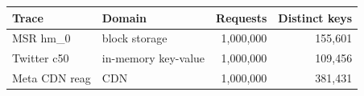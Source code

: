 \begin{tabular}{llrr}
\toprule
Trace & Domain & Requests & Distinct keys \\
\midrule
MSR hm\_0 & block storage & 1,000,000 & 155,601 \\
Twitter c50 & in-memory key-value & 1,000,000 & 109,456 \\
Meta CDN reag & CDN & 1,000,000 & 381,431 \\
\bottomrule
\end{tabular}
